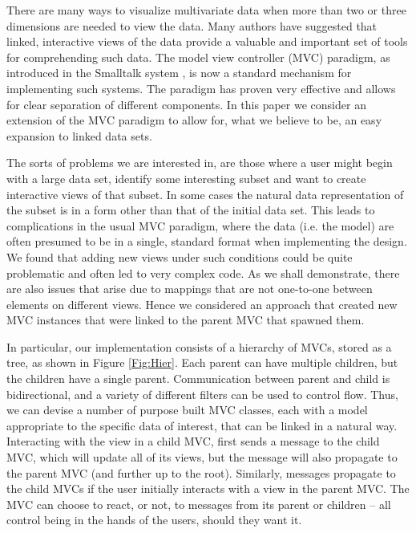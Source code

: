 \documentclass[11pt]{article}
\begin{document}
There are many ways to visualize multivariate data when more than
two or three dimensions are needed to view the data.  Many authors
\citep{intGrUnwin, DynGraphics, IEEEVisual, GGobi, DataDesk}
have suggested that linked, interactive views of the data
provide a valuable and important set of tools for comprehending such
data.  The model view controller (MVC) paradigm, as introduced in the
Smalltalk system \cite{Smalltalk}, is now a standard
mechanism for implementing such systems.  The paradigm has proven very
effective and allows for clear separation of different components.
In this paper we consider an extension of the MVC paradigm to allow
for, what we believe to be, an easy expansion to linked data sets.

The sorts of problems we are interested in, are those where a user
might begin with a large data set, identify some interesting subset
and want to create interactive views of that subset.  In some cases the
natural data representation of the subset is in a form other than that
of the initial data set.  This leads to complications in the usual MVC
paradigm, where the data (i.e. the model) are often presumed to be in
a single, standard format when implementing the design.  We found that 
adding new views under such conditions could be quite problematic and 
often led to very complex code.  As we shall demonstrate, there are 
also issues that arise due to mappings that are not one-to-one between 
elements on different views.  Hence we considered an approach that 
created new MVC instances that were linked to the parent MVC that 
spawned them. 

In particular, our implementation consists of a hierarchy of MVCs,
stored as a tree, as shown in Figure \ref{Fig:Hier}.  Each parent can 
have multiple children, but the
children have a single parent.  Communication between parent and
child is bidirectional, and a variety of different filters can be used
to control flow.  Thus, we can devise a number of purpose built MVC
classes, each with a model appropriate to the specific data of
interest, that can be linked in a natural way.  Interacting with the view
in a child MVC, first sends a message to the child MVC, which will
update all of its views, but the message will also propagate to the
parent MVC (and further up to the root).  Similarly, messages propagate 
to the child MVCs if the user initially interacts with a view in the 
parent MVC.  The MVC can choose to react, or not, to messages from its 
parent or children -- all control being in
the hands of the users, should they want it.
\end{document}
